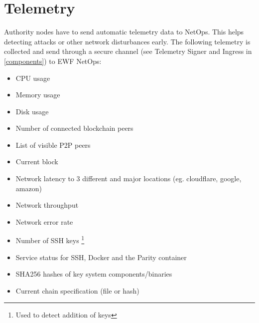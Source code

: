 \section{Telemetry}

Authority nodes have to send automatic telemetry data to NetOps. This helps detecting attacks or other network disturbances early.
The following telemetry is collected and send through a secure channel (see Telemetry Signer and Ingress in \ref{components}) to EWF NetOps:

\begin{itemize}
    \item CPU usage
    \item Memory usage
    \item Disk usage
    \item Number of connected blockchain peers
    \item List of visible P2P peers
    \item Current block
    \item Network latency to 3 different and major locations (eg. cloudflare, google, amazon)
    \item Network throughput
    \item Network error rate
    \item Number of SSH keys \footnote{Used to detect addition of keys}
    \item Service status for SSH, Docker and the Parity container
    \item SHA256 hashes of key system components/binaries
    \item Current chain specification (file or hash)
\end{itemize}